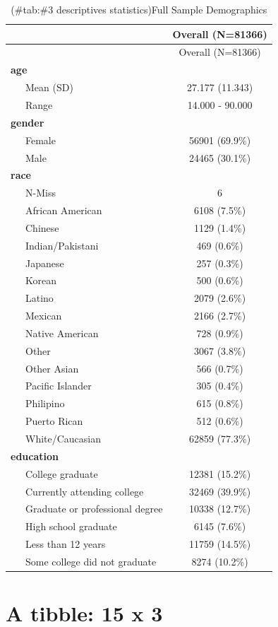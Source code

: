 \documentclass[
  english,
  man]{apa6}
\begin{document}
\begin{longtable}[]{@{}lc@{}}
\caption{(\#tab:\#3 descriptives statistics)Full Sample Demographics}\tabularnewline
\toprule
& Overall (N=81366) \\
\midrule
\endfirsthead
\toprule
& Overall (N=81366) \\
\midrule
\endhead
\textbf{age} & \\
~~~Mean (SD) & 27.177 (11.343) \\
~~~Range & 14.000 - 90.000 \\
\textbf{gender} & \\
~~~Female & 56901 (69.9\%) \\
~~~Male & 24465 (30.1\%) \\
\textbf{race} & \\
~~~N-Miss & 6 \\
~~~African American & 6108 (7.5\%) \\
~~~Chinese & 1129 (1.4\%) \\
~~~Indian/Pakistani & 469 (0.6\%) \\
~~~Japanese & 257 (0.3\%) \\
~~~Korean & 500 (0.6\%) \\
~~~Latino & 2079 (2.6\%) \\
~~~Mexican & 2166 (2.7\%) \\
~~~Native American & 728 (0.9\%) \\
~~~Other & 3067 (3.8\%) \\
~~~Other Asian & 566 (0.7\%) \\
~~~Pacific Islander & 305 (0.4\%) \\
~~~Philipino & 615 (0.8\%) \\
~~~Puerto Rican & 512 (0.6\%) \\
~~~White/Caucasian & 62859 (77.3\%) \\
\textbf{education} & \\
~~~College graduate & 12381 (15.2\%) \\
~~~Currently attending college & 32469 (39.9\%) \\
~~~Graduate or professional degree & 10338 (12.7\%) \\
~~~High school graduate & 6145 (7.6\%) \\
~~~Less than 12 years & 11759 (14.5\%) \\
~~~Some college did not graduate & 8274 (10.2\%) \\
\bottomrule
\end{longtable}

\hypertarget{a-tibble-15-x-3}{%
\section{A tibble: 15 x 3}\label{a-tibble-15-x-3}}
\end{document}
